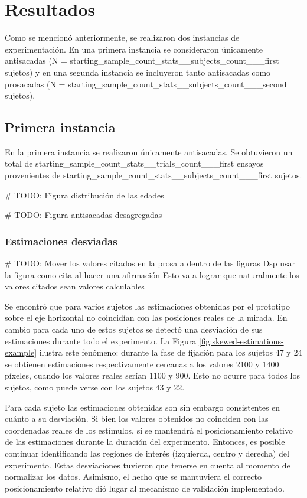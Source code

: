 \section{{Resultados}}

Como se mencionó anteriormente, se realizaron dos instancias de experimentación.
En una primera instancia se consideraron únicamente antisacadas (N =
{starting_sample_count_stats__subjects_count___first} sujetos) y en una segunda
instancia se incluyeron tanto antisacadas como prosacadas (N =
{starting_sample_count_stats__subjects_count___second} sujetos).

\subsection{{Primera instancia}}

En la primera instancia se realizaron únicamente antisacadas. Se obtuvieron un
total de {starting_sample_count_stats__trials_count___first} ensayos
provenientes de {starting_sample_count_stats__subjects_count___first} sujetos.

# TODO: Figura distribución de las edades

# TODO: Figura antisacadas desagregadas

\subsubsection{{Estimaciones desviadas}}

# TODO: Mover los valores citados en la prosa a dentro de las figuras
        Dsp usar la figura como cita al hacer una afirmación
        Esto va a lograr que naturalmente los valores citados sean valores
        calculables

Se encontró que para varios sujetos las estimaciones obtenidas por el prototipo
sobre el eje horizontal no coincidían con las posiciones reales de la mirada.
En cambio para cada uno de estos sujetos se detectó una desviación de sus
estimaciones durante todo el experimento.
La Figura \ref{fig:skewed-estimations-example} ilustra este fenómeno:
durante la fase de fijación para los sujetos 47 y 24 se obtienen estimaciones
respectivamente cercanas a los valores 2100 y 1400 píxeles, cuando los valores
reales serían 1100 y 900.
Esto no ocurre para todos los sujetos, como puede verse con los sujetos 43 y 22.

Para cada sujeto las estimaciones obtenidas son sin embargo consistentes en
cuánto a su desviación. Si bien los valores obtenidos no coinciden con las
coordenadas reales de los estímulos, sí se mantendrá el posicionamiento
relativo de las estimaciones durante la duración del experimento. Entonces, es
posible continuar identificando las regiones de interés (izquierda, centro y
derecha) del experimento. Estas desviaciones tuvieron que tenerse en cuenta al
momento de normalizar los datos. Asimismo, el hecho que se mantuviera el
correcto posicionamiento relativo dió lugar al mecanismo de validación
implementado.

